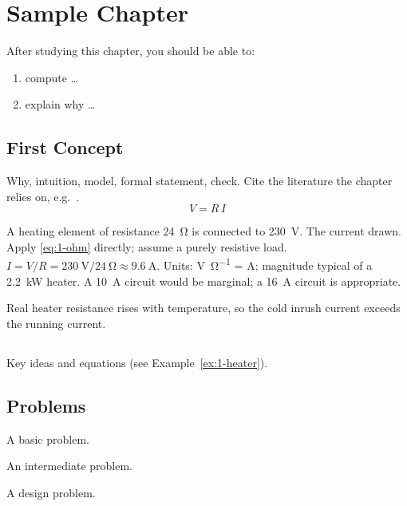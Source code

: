 \chapter{Sample Chapter}\label{ch:1-sample}


\begin{objectives}
After studying this chapter, you should be able to:
\begin{enumerate}[label=\arabic*.]
  \item compute \dots
  \item explain why \dots
\end{enumerate}
\end{objectives}

\section{First Concept}\label{sec:1-first}
Why, intuition, model, formal statement, check. Cite the literature the chapter relies on, e.g.\ \citet{boyce2014}.
\begin{equation}\label{eq:1-ohm}
  V = R\,I
\end{equation}

\begin{example}\label{ex:1-heater}
\exgiven A heating element of resistance \SI{24}{\ohm} is connected to \SI{230}{\volt}.
\exfind The current drawn.
\exapproach Apply \eqref{eq:1-ohm} directly; assume a purely resistive load.
\exsolution $I = V/R = \SI{230}{\volt}/\SI{24}{\ohm} \approx \SI{9.6}{\ampere}$.
\excheck Units: \si{\volt\per\ohm} = \si{\ampere}; magnitude typical of a \SI{2.2}{\kilo\watt} heater.
\exdiscussion A \SI{10}{\ampere} circuit would be marginal; a \SI{16}{\ampere} circuit is appropriate.
\end{example}

\begin{practicenote}
Real heater resistance rises with temperature, so the cold inrush current exceeds the running current.
\end{practicenote}

\section*{\summaryname}
Key ideas and equations (see Example~\ref{ex:1-heater}).

\section*{Problems}
\begin{problems}
  \item A basic problem.
  \item\probint{} An intermediate problem.
  \item\probdesign{} A design problem.
\end{problems}



